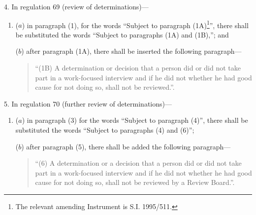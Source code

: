 \documentclass[12pt,a4paper]{article}
\begin{document}
\medskip

4.  In regulation 69 (review of determinations)—
\begin{enumerate}\item[]
($a$) in paragraph (1), for the words “Subject to paragraph (1A)\footnote{\frenchspacing The relevant amending Instrument is S.I. 1995/511.}”, there shall be substituted the words “Subject to paragraphs (1A) and (1B),”; and

($b$) after paragraph (1A), there shall be inserted the following paragraph—
\begin{quotation}
“(1B) A determination or decision that a person did or did not take part in a work-focused interview and if he did not whether he had good cause for not doing so, shall not be reviewed.”.
\end{quotation}
\end{enumerate}

\medskip

5.  In regulation 70 (further review of determinations)—
\begin{enumerate}\item[]
($a$) in paragraph (3) for the words “Subject to paragraph (4)”, there shall be substituted the words “Subject to paragraphs (4) and (6)”;

($b$) after paragraph (5), there shall be added the following paragraph—
\begin{quotation}
“(6) A determination or a decision that a person did or did not take part in a work-focused interview and if he did not whether he had good cause for not doing so, shall not be reviewed by a Review Board.”.
\end{quotation}
\end{enumerate}

\medskip
\end{document}
